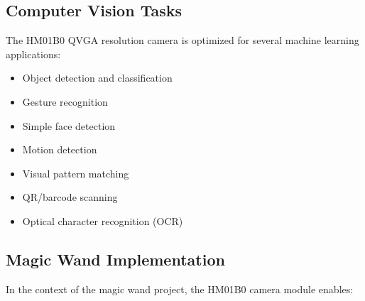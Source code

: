 \subsection{Computer Vision Tasks}



The HM01B0 QVGA resolution camera is optimized for several machine learning applications:



\begin{itemize}
    
    
    
    \item Object detection and classification
    
    
    
    \item Gesture recognition
    
    
    
    \item Simple face detection
    
    
    
    \item Motion detection
    
    
    
    \item Visual pattern matching
    
    
    
    \item QR/barcode scanning
    
    
    
    \item Optical character recognition (OCR)
    
    
    
\end{itemize}







\subsection{Magic Wand Implementation}



In the context of the magic wand project, the HM01B0 camera module enables:



